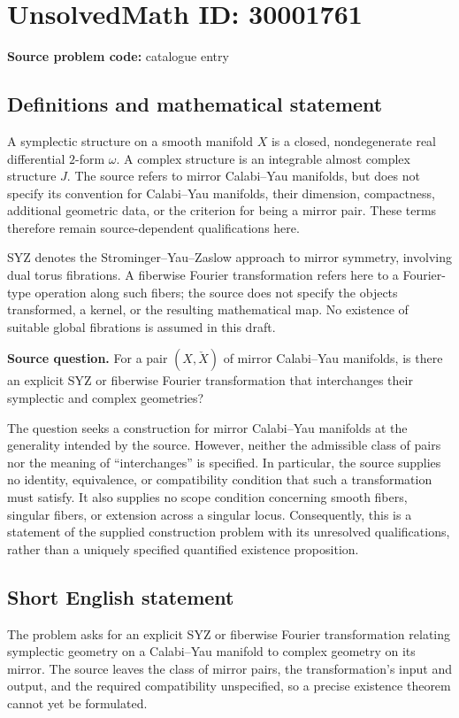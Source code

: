 \documentclass[11pt]{article}
\begin{document}
\section*{UnsolvedMath ID: 30001761}
\textbf{Source problem code:} catalogue entry
\subsection{Definitions and mathematical statement}
A symplectic structure on a smooth manifold \(X\) is a closed, nondegenerate real differential \(2\)-form \(\omega\). A complex structure is an integrable almost complex structure \(J\). The source refers to mirror Calabi--Yau manifolds, but does not specify its convention for Calabi--Yau manifolds, their dimension, compactness, additional geometric data, or the criterion for being a mirror pair. These terms therefore remain source-dependent qualifications here.

SYZ denotes the Strominger--Yau--Zaslow approach to mirror symmetry, involving dual torus fibrations. A fiberwise Fourier transformation refers here to a Fourier-type operation along such fibers; the source does not specify the objects transformed, a kernel, or the resulting mathematical map. No existence of suitable global fibrations is assumed in this draft.

\textbf{Source question.} For a pair \((X,\check X)\) of mirror Calabi--Yau manifolds, is there an explicit SYZ or fiberwise Fourier transformation that interchanges their symplectic and complex geometries?

The question seeks a construction for mirror Calabi--Yau manifolds at the generality intended by the source. However, neither the admissible class of pairs nor the meaning of ``interchanges'' is specified. In particular, the source supplies no identity, equivalence, or compatibility condition that such a transformation must satisfy. It also supplies no scope condition concerning smooth fibers, singular fibers, or extension across a singular locus. Consequently, this is a statement of the supplied construction problem with its unresolved qualifications, rather than a uniquely specified quantified existence proposition.
\subsection{Short English statement}
The problem asks for an explicit SYZ or fiberwise Fourier transformation relating symplectic geometry on a Calabi--Yau manifold to complex geometry on its mirror. The source leaves the class of mirror pairs, the transformation's input and output, and the required compatibility unspecified, so a precise existence theorem cannot yet be formulated.
\end{document}
